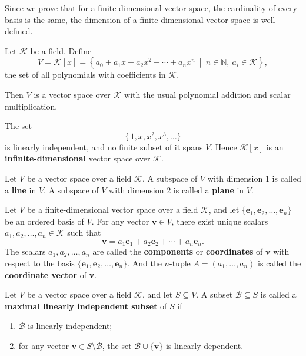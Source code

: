 \documentclass{ctexart}
\begin{document}
	\begin{myrmk}
		Since we prove that for a finite-dimensional vector space, the cardinality of every basis is the same, the dimension of a finite-dimensional vector space is well-defined.
	\end{myrmk}
	\begin{myex}
		Let $\mathcal{K}$ be a field.  
		Define
		\[
		V = \mathcal{K}[x] = 
		\left\{
		a_0 + a_1x + a_2x^2 + \cdots + a_nx^n 
		\ \middle| \ 
		n \in \mathbb{N},\ a_i \in \mathcal{K}
		\right\},
		\]
		the set of all polynomials with coefficients in $\mathcal{K}$.
		
		Then $V$ is a vector space over $\mathcal{K}$ with the usual polynomial addition and scalar multiplication.
		
		The set 
		\[
		\{\, 1, x, x^2, x^3, \dots \}
		\]
		is linearly independent, and no finite subset of it spans $V$.  
		Hence $\mathcal{K}[x]$ is an \textbf{infinite-dimensional} vector space over $\mathcal{K}$.
	\end{myex}
	
	\begin{mydef}
		Let $V$ be a vector space over a field $\mathcal{K}$.  
		A subspace of $V$ with dimension $1$ is called a \textbf{line} in $V$.  
		A subspace of $V$ with dimension $2$ is called a \textbf{plane} in $V$.
	\end{mydef}
	
	
	\begin{mydef}
		Let $V$ be a finite-dimensional vector space over a field $\mathcal{K}$, and let 
		$\{\mathbf{e}_1, \mathbf{e}_2, \dots, \mathbf{e}_n\}$ be an ordered basis of $V$.  
		For any vector $\mathbf{v} \in V$, there exist unique scalars 
		$a_1, a_2, \dots, a_n \in \mathcal{K}$ such that
		\[
		\mathbf{v} = a_1 \mathbf{e}_1 + a_2 \mathbf{e}_2 + \cdots + a_n \mathbf{e}_n.
		\]
		The scalars $a_1, a_2, \dots, a_n$ are called the \textbf{components} or \textbf{coordinates} of $\mathbf{v}$ 
		with respect to the basis $\{\mathbf{e}_1, \mathbf{e}_2, \dots, \mathbf{e}_n\}$. And the $n$-tuple $A=(a_1,\dots,a_n)$ is called the \textbf{coordinate vector} of \textbf{v}.
	\end{mydef}
	
	\begin{mydef}
		Let $V$ be a vector space over a field $\mathcal{K}$, and let 
		$S \subseteq V$.  
		A subset $\mathcal{B} \subseteq S$ is called a \textbf{maximal linearly independent subset} of $S$ if
		\begin{enumerate}
			\item $\mathcal{B}$ is linearly independent;
			\item for any vector $\mathbf{v} \in S \setminus \mathcal{B}$, the set 
			$\mathcal{B} \cup \{\mathbf{v}\}$ is linearly dependent.
		\end{enumerate}
	\end{mydef}
	
\end{document}
